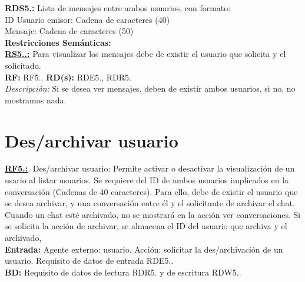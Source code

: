 \textcolor{azul}{\textbf{RDS5.\theRDS:}} Lista de mensajes entre ambos usuarios, con formato:\\
\hspace*{1cm} ID Usuario emisor: Cadena de caracteres (40) \\
\hspace*{1cm} Mensaje: Cadena de caracteres (50) \\[12pt]

\setcounter{RS}{1}
\textbf{\textcolor{verde}{Restricciones Semánticas:}} \\[6pt]
\textbf{\textcolor{verde}{\underline{RS5.\theRF.\theRS:}}} Para visualizar los mensajes debe de existir el usuario que solicita y el solicitado. \\
\textbf{RF:} RF5.\theRF. \textbf{RD(s):} RDE5.\theRDE, RDR5.\theRDR \\
\hspace*{1cm} \textit{Descripción:} Si se desea ver mensajes, deben de existir ambos usuarios, si no, no mostramos nada. \\ [6pt]

\section{Des/archivar usuario}
\textbf{\textcolor{rojo}{\underline{RF5.\theRF:}}}. Des/archivar usuario: Permite activar o desactivar la visualización de un usario al listar usuarios. 
Se requiere del ID de ambos usuarios implicados en la conversación (Cadenas de 40 caracteres). Para ello, debe de existir 
el usuario que se desea archivar, y una conversación entre él y el solicitante de archivar el chat. Cuando un chat esté archivado, no se mostrará en la acción ver 
conversaciones. Si se solicita la acción de archivar, se almacena el ID del usuario que archiva y el archivado, \\[6pt]

\textbf{\textcolor{rojo}{Entrada:}} Agente externo: usuario. Acción: solicitar la des/archivación de un usuario. 
Requisito de datos de entrada \textcolor{azul}{RDE5.\theRDE}. \\[6pt]

\textbf{\textcolor{rojo}{BD:}} Requisito de datos de lectura \textcolor{azul}{RDR5.\theRDR} y de escritura \textcolor{azul}{RDW5.\theRDW}. \\[6pt]

